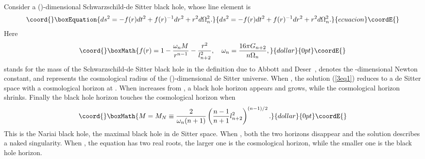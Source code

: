 \documentclass[a4paper,12pt]{article}
\begin{document}
Consider a (\coordHE{})-dimensional Schwarzschild-de Sitter black hole,
whose line element is
\begin{equation}\coord{}\boxEquation{
\label{3eq1} ds^2 =- f(r) dt^2 +f(r)^{-1}dr^2 +r^2 d\Omega_{n}^2.
}{
ds^2 =- f(r) dt^2 +f(r)^{-1}dr^2 +r^2 d\Omega_{n}^2.
}{ecuacion}\coordE{}\end{equation}
Here
$$\coord{}\boxMath{ f(r) =1 -\frac{\omega_n M}{r^{n-1}} -\frac{r^2}{l_{n+2}^2}, \ \ \
 \omega_n=\frac{16\pi G_{n+2}}{n \Omega_n},}{dollar}{0pt}\coordE{}$$
\myHighlight{$M$}\coordHE{} stands for the mass of the Schwarzschild-de Sitter black hole
in the definition due to Abbott and Deser~\cite{AD}, \myHighlight{$G_{n+2}$}\coordHE{}
denotes the \myHighlight{$(n+2)$}\coordHE{}-dimensional Newton constant, and
\myHighlight{$l_{n+2}$}\coordHE{} represents the cosmological radius of the
(\myHighlight{$n+2$}\coordHE{})-dimensional de Sitter universe. When \coordHE{}, the solution
(\ref{3eq1}) reduces to a  de Sitter space with a cosmological
horizon at \coordHE{}. When \coordHE{} increases from \coordHE{}, a black
hole horizon appears and grows, while the cosmological horizon shrinks. 
Finally the black hole horizon \myHighlight{$r_{\rm BH}$}\coordHE{} touches the cosmological 
horizon \myHighlight{$r_{\rm CH}$}\coordHE{} when
$$\coord{}\boxMath{ M =M_N \equiv \frac{2}{\omega_n (n+1)}\left
(\frac{n-1}{n+1}l^2_{n+2}\right)^{(n-1)/2}.}{dollar}{0pt}\coordE{}$$
 This is the Nariai black hole, the maximal black hole in de
 Sitter space. When \coordHE{}, both the two horizons disappear and
 the solution describes a naked singularity. When \myHighlight{$M <M_N$}\coordHE{}, the
 equation \myHighlight{$f(r)=0$}\coordHE{} has two real roots, the larger one is the
 cosmological horizon, while the smaller one is the black hole
 horizon.
\end{document}
